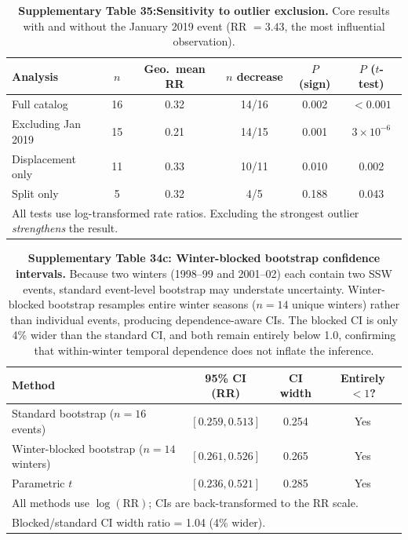 \documentclass[11pt,letterpaper]{article}
\begin{document}
\begin{table}[h!]
\centering
\caption{\textbf{Supplementary Table 35:Sensitivity to outlier exclusion.} Core results with and without the January 2019 event (RR $= 3.43$, the most influential observation).}
\label{tab:outlier_sens}
\begin{tabular}{lccccc}
\toprule
Analysis & $n$ & Geo.\ mean RR & $n$ decrease & $P$ (sign) & $P$ ($t$-test) \\
\midrule
Full catalog & 16 & 0.32 & 14/16 & 0.002 & $< 0.001$ \\
Excluding Jan 2019 & 15 & 0.21 & 14/15 & 0.001 & $3 \times 10^{-6}$ \\
Displacement only & 11 & 0.33 & 10/11 & 0.010 & 0.002 \\
Split only & 5 & 0.32 & 4/5 & 0.188 & 0.043 \\
\bottomrule
\multicolumn{6}{l}{\footnotesize All tests use log-transformed rate ratios. Excluding the strongest outlier \emph{strengthens} the result.} \\
\end{tabular}
\end{table}

\begin{table}[h!]
\centering
\caption{\textbf{Supplementary Table 34c: Winter-blocked bootstrap confidence intervals.} Because two winters (1998--99 and 2001--02) each contain two SSW events, standard event-level bootstrap may understate uncertainty. Winter-blocked bootstrap resamples entire winter seasons ($n = 14$ unique winters) rather than individual events, producing dependence-aware CIs. The blocked CI is only 4\% wider than the standard CI, and both remain entirely below 1.0, confirming that within-winter temporal dependence does not inflate the inference.}
\label{tab:winter_boot}
\begin{tabular}{lccc}
\toprule
Method & 95\% CI (RR) & CI width & Entirely $< 1$? \\
\midrule
Standard bootstrap ($n = 16$ events) & $[0.259, 0.513]$ & 0.254 & Yes \\
Winter-blocked bootstrap ($n = 14$ winters) & $[0.261, 0.526]$ & 0.265 & Yes \\
Parametric $t$ & $[0.236, 0.521]$ & 0.285 & Yes \\
\bottomrule
\multicolumn{4}{l}{\footnotesize All methods use $\log(\mathrm{RR})$; CIs are back-transformed to the RR scale.} \\
\multicolumn{4}{l}{\footnotesize Blocked/standard CI width ratio = 1.04 (4\% wider).} \\
\end{tabular}
\end{table}
\end{document}
